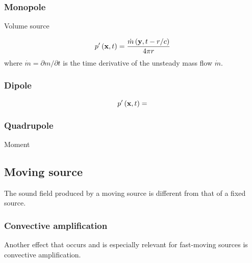 \subsubsection*{Monopole}

Volume source
%

\begin{equation}
 p' \left(\mathbf{x},t\right) = \frac{\dot{m} \left(\mathbf{y}, t-r/c\right)}{ 4 \pi r}
\end{equation}
where $\dot{m} = \partial m / \partial t$ is the time derivative of the unsteady mass flow $\dot{m}$.

\subsubsection*{Dipole}

\begin{equation}
 p' \left(\mathbf{x}, t\right) =
\end{equation}


\subsubsection*{Quadrupole}

Moment

%
%
%


\subsection{Moving source}
The sound field produced by a moving source is different from that of a fixed source.

\subsubsection{Convective amplification}
Another effect that occurs and is especially relevant for fast-moving sources is
convective amplification.

\cite{Dowling1976}


